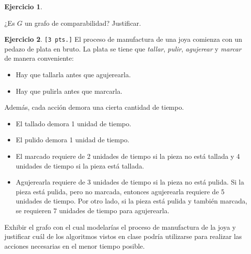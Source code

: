 \documentclass[a4paper,oneside,12pt]{amsart}
\theoremstyle{definition}
\newtheorem{quest}{Ejercicio}
\begin{document}
\begin{quest}
\begin{enumerate}[label=\alph*)]
\begin{center}
        \end{center}
        ¿Es $G$ un grafo de comparabilidad? Justificar.
    \end{enumerate}
\end{quest}



\begin{quest}
    \verb|[3 pts.]|
    El proceso de manufactura de una joya comienza con un pedazo de plata en bruto. La plata se tiene que
    \textit{tallar}, \textit{pulir}, \textit{agujerear} y \textit{marcar} de manera conveniente:
    \begin{itemize}
        \item Hay que tallarla antes que agujerearla.
        \item Hay que pulirla antes que marcarla.
    \end{itemize}
    Además, cada acción demora una cierta cantidad de tiempo.
    \begin{itemize}
        \item El tallado demora 1 unidad de tiempo.
        \item El pulido demora 1 unidad de tiempo.
        \item El marcado requiere de 2 unidades de tiempo si la pieza no está tallada y 4 unidades de
        tiempo si la pieza está tallada.
        \item Agujerearla requiere de 3 unidades de tiempo si la pieza no está pulida. Si la pieza está pulida, pero
        no marcada, entonces agujerearla requiere de 5 unidades de tiempo. Por otro lado, si la pieza
        está pulida y también marcada, se requieren 7 unidades de tiempo para agujerearla.
    \end{itemize}

    Exhibir el grafo con el cual modelarías el proceso de manufactura de la joya y justificar cuál de los algoritmos
    vistos en clase podría utilizarse para realizar las acciones necesarias en el menor tiempo posible.
\end{quest}


\end{document}

